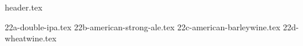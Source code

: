 \clearpage
{}
\divisorLine
{header.tex}
\begin{multicols}{2}
{22a-double-ipa.tex}
{22b-american-strong-ale.tex}
{22c-american-barleywine.tex}
{22d-wheatwine.tex}
\end{multicols}